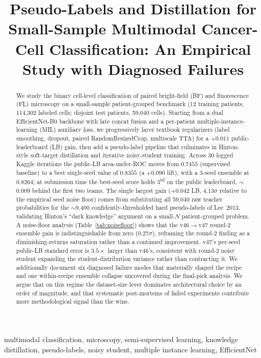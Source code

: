 \documentclass[conference]{IEEEtran}
\title{Pseudo-Labels and Distillation for Small-Sample Multimodal Cancer-Cell Classification: An Empirical Study with Diagnosed Failures}
\author{
  \IEEEauthorblockN{Rafael Tavares Proen\c{c}a}
  \IEEEauthorblockA{
    Department of Information Technology\\
    Uppsala University, Sweden\\
    Email: rafaeltproenca@gmail.com
  }
}
\begin{document}
\maketitle

\begin{abstract}
We study the binary cell-level classification of paired bright-field (BF) and fluorescence (FL) microscopy on a small-sample patient-grouped benchmark (12 training patients, 114{,}302 labeled cells; disjoint test patients, 59{,}040 cells). Starting from a dual EfficientNet-B0 backbone with late concat fusion and a per-patient multiple-instance-learning (MIL) auxiliary loss, we progressively layer textbook regularizers (label smoothing, dropout, paired RandomResizedCrop, multiscale TTA) for a $+0.011$ public-leaderboard (LB) gain, then add a pseudo-label pipeline that culminates in Hinton-style soft-target distillation and iterative noisy-student training. Across 30 logged Kaggle iterations the public-LB area-under-ROC moves from $0.7455$ (supervised baseline) to a best single-seed value of $0.8355$ (a $+0.090$ lift), with a 3-seed ensemble at $0.8264$; at submission time the best-seed score holds $3$\textsuperscript{rd} on the public leaderboard, $\sim$$0.009$ behind the first two teams. The single largest gain ($+0.042$ LB, $4.13\sigma$ relative to the empirical seed noise floor) comes from substituting all 59{,}040 raw teacher probabilities for the $\sim$9{,}400 confidently-thresholded hard pseudo-labels of Lee~2013, validating Hinton's ``dark knowledge'' argument on a small-$N$ patient-grouped problem. A noise-floor analysis (Table~\ref{tab:noisefloor}) shows that the v46$\rightarrow$v47 round-2 ensemble gain is indistinguishable from zero ($0.27\sigma$), reframing the round-2 finding as a diminishing-returns saturation rather than a continued improvement. v47's per-seed public-LB standard error is $3.5\times$ larger than v46's, consistent with round-2 noisy student expanding the student-distribution variance rather than contracting it. We additionally document six diagnosed failure modes that materially shaped the recipe and one within-recipe ensemble collapse uncovered during the final-pick analysis. We argue that on this regime the dataset-size lever dominates architectural choice by an order of magnitude, and that systematic post-mortems of failed experiments contribute more methodological signal than the wins.
\end{abstract}

\begin{IEEEkeywords}
multimodal classification, microscopy, semi-supervised learning, knowledge distillation, pseudo-labels, noisy student, multiple instance learning, EfficientNet
\end{IEEEkeywords}
\end{document}
